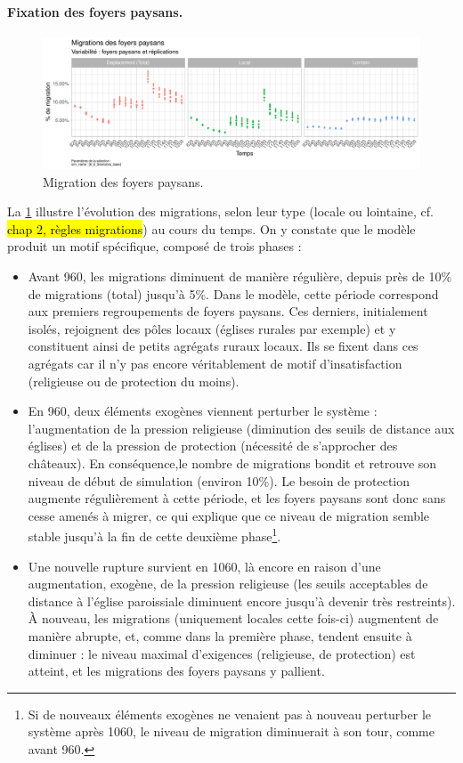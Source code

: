\paragraph{Fixation des foyers paysans.}

\begin{figure}[H]
	\centering
	\includegraphics[width=\linewidth]{img/results_6_6/FP_TypeDeplacements_Haut.pdf}
	\caption{Migration des foyers paysans.}
	\label{fig:results-fp-migrations-base}
\end{figure}

La \cref{fig:results-fp-migrations-base} illustre l'évolution des migrations, selon leur type (locale ou lointaine, cf. \hl{chap 2, règles migrations}) au cours du temps.
On y constate que le modèle produit un motif spécifique, composé de trois phases :
\begin{itemize}
	\item Avant 960, les migrations diminuent de manière régulière, depuis près de 10\% de migrations (total) jusqu'à 5\%.
	Dans le modèle, cette période correspond aux premiers regroupements de foyers paysans.
	Ces derniers, initialement isolés, rejoignent des pôles locaux (églises rurales par exemple) et y constituent ainsi de petits agrégats ruraux locaux.
	Ils se fixent dans ces agrégats car il n'y pas encore véritablement de motif d'insatisfaction (religieuse ou de protection du moins).
	\item En 960, deux éléments exogènes viennent perturber le système : l'augmentation de la pression religieuse (diminution des seuils de distance aux églises) et de la pression de protection (nécessité de s'approcher des châteaux).
	En conséquence,le nombre de migrations bondit et retrouve son niveau de début de simulation (environ 10\%).
	Le besoin de protection augmente régulièrement à cette période, et les foyers paysans sont donc sans cesse amenés à migrer, ce qui explique que ce niveau de migration semble stable jusqu'à la fin de cette deuxième phase\footnote{
		Si de nouveaux éléments exogènes ne venaient pas à nouveau perturber le système après 1060, le niveau de migration diminuerait à son tour, comme avant 960.
	}.
	\item Une nouvelle rupture survient en 1060, là encore en raison d'une augmentation, exogène, de la pression religieuse (les seuils acceptables de distance à l'église paroissiale diminuent encore jusqu'à devenir très restreints).
	À nouveau, les migrations (uniquement locales cette fois-ci) augmentent de manière abrupte, et, comme dans la première phase, tendent ensuite à diminuer : le niveau maximal d'exigences (religieuse, de protection) est atteint, et les migrations des foyers paysans y pallient.
\end{itemize}

